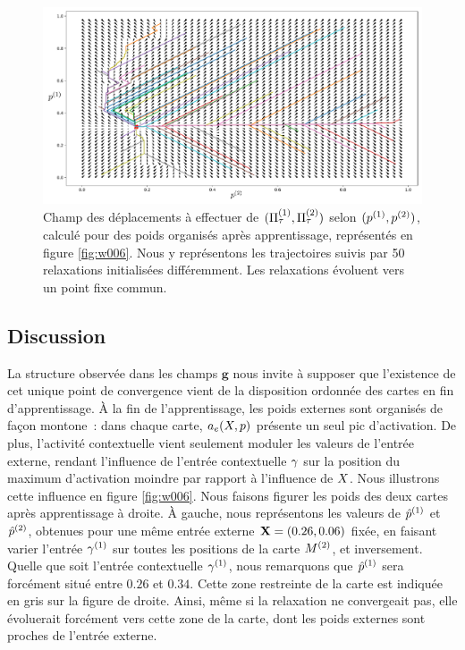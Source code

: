 \documentclass[../main]{subfiles}
\begin{document}
\begin{figure}
\centering
\includegraphics[width=\textwidth]{champ_006.pdf}
\caption{Champ des déplacements à effectuer de $(\Pi^{({1})}_\tau, \Pi^{({2})}_\tau)$ selon $(p^{({1})}, p^{({2})})$, calculé pour des poids organisés après apprentissage, représentés en figure \ref{fig:w006}. Nous y représentons les trajectoires suivis par 50 relaxations initialisées différemment. Les relaxations évoluent vers un point fixe commun.}
\label{fig:champ_9999}
\end{figure}

\subsection{Discussion}
La structure observée dans les champs $\mathbf{g}$ nous invite à supposer que l'existence de cet unique point de convergence vient de la disposition ordonnée des cartes en fin d'apprentissage. 
\`A la fin de l'apprentissage, les poids externes sont organisés de façon montone~: dans chaque carte, $a_e(X,p)$ présente un seul pic d'activation.
De plus, l'activité contextuelle vient seulement moduler les valeurs de l'entrée externe, rendant l'influence de l'entrée contextuelle $\gamma$ sur la position du maximum d'activation moindre par rapport à l'influence de $X$.
Nous illustrons cette influence en figure \ref{fig:w006}. 
Nous faisons figurer les poids des deux cartes après apprentissage à droite. 
\`A gauche, nous représentons les valeurs de $\hat{p}^{({1})}$ et $\hat{p}^{({2})}$, obtenues pour une même entrée externe $\mathbf{X} = (0.26, 0.06)$ fixée, en faisant varier l'entrée $\gamma^{({1})}$ sur toutes les positions de la carte $M^{({2})}$, et inversement.
Quelle que soit l'entrée contextuelle $\gamma^{({1})}$, nous remarquons que $\hat{p}^{({1})}$ sera forcément situé entre $0.26$ et $0.34$.
Cette zone restreinte de la carte est indiquée en gris sur la figure de droite.
Ainsi, même si la relaxation ne convergeait pas, elle évoluerait forcément vers cette zone de la carte, dont les poids externes sont proches de l'entrée externe.
\end{document}

